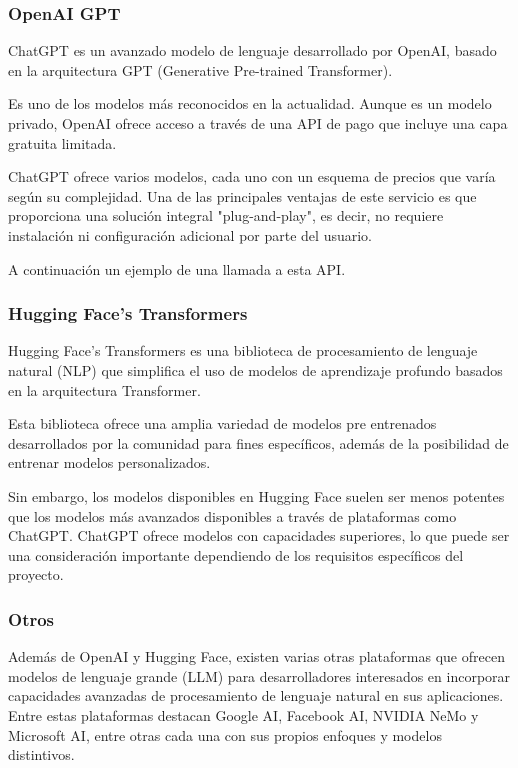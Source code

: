\subsubsection*{OpenAI GPT}
ChatGPT es un avanzado modelo de lenguaje desarrollado por OpenAI,
basado en la arquitectura GPT (Generative Pre-trained Transformer).

Es uno de los modelos más reconocidos en la actualidad.
Aunque es un modelo privado, OpenAI ofrece acceso a través de una API de pago que incluye una capa gratuita limitada.

ChatGPT ofrece varios modelos, cada uno con un esquema de precios que varía según
su complejidad.
Una de las principales ventajas de este servicio es que proporciona una solución integral "plug-and-play", es decir, no
requiere instalación ni configuración adicional por parte del usuario.

A continuación un ejemplo de una llamada a esta API.


\subsubsection*{Hugging Face's Transformers}
Hugging Face's Transformers
es una biblioteca de procesamiento de lenguaje natural (NLP) que simplifica el uso de modelos de aprendizaje profundo
basados en la arquitectura Transformer.

Esta biblioteca ofrece una amplia variedad de modelos pre entrenados desarrollados por la comunidad
para fines específicos, además de la posibilidad de entrenar modelos personalizados.


Sin embargo, los modelos disponibles en Hugging Face suelen ser menos potentes que los modelos más
avanzados disponibles a través de plataformas como ChatGPT. ChatGPT ofrece
modelos con capacidades superiores, lo que puede ser una
consideración importante dependiendo de los requisitos específicos del proyecto.

\subsubsection*{Otros}
Además de OpenAI y Hugging Face, existen varias otras plataformas que ofrecen modelos de lenguaje
grande (LLM) para desarrolladores interesados en incorporar capacidades
avanzadas de procesamiento de lenguaje natural en sus aplicaciones. Entre
estas plataformas destacan Google AI, Facebook AI, NVIDIA NeMo y Microsoft AI, entre otras cada una con sus propios
enfoques y modelos distintivos.

